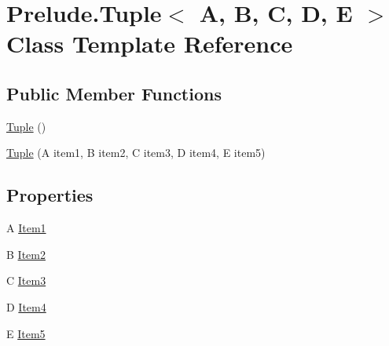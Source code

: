 \hypertarget{class_prelude_1_1_tuple_3_01_a_00_01_b_00_01_c_00_01_d_00_01_e_01_4}{\section{Prelude.\+Tuple$<$ A, B, C, D, E $>$ Class Template Reference}
\label{class_prelude_1_1_tuple_3_01_a_00_01_b_00_01_c_00_01_d_00_01_e_01_4}
}
\subsection*{Public Member Functions}
\begin{DoxyCompactItemize}
\item 
\hyperlink{class_prelude_1_1_tuple_3_01_a_00_01_b_00_01_c_00_01_d_00_01_e_01_4_a1b144ea223698f4d8c7433d9f493a9f0}{Tuple} ()
\item 
\hyperlink{class_prelude_1_1_tuple_3_01_a_00_01_b_00_01_c_00_01_d_00_01_e_01_4_ad92b8e0ca2416f0233f61d047e29d906}{Tuple} (A item1, B item2, C item3, D item4, E item5)
\end{DoxyCompactItemize}
\subsection*{Properties}
\begin{DoxyCompactItemize}
\item 
A \hyperlink{class_prelude_1_1_tuple_3_01_a_00_01_b_00_01_c_00_01_d_00_01_e_01_4_a5397a56c1b2d4914ad4adbd95fed35a5}{Item1}
\item 
B \hyperlink{class_prelude_1_1_tuple_3_01_a_00_01_b_00_01_c_00_01_d_00_01_e_01_4_a673868ea1ddededa034ba7b745e04d90}{Item2}
\item 
C \hyperlink{class_prelude_1_1_tuple_3_01_a_00_01_b_00_01_c_00_01_d_00_01_e_01_4_acf532e5def7b6d4352eb806855bd929b}{Item3}
\item 
D \hyperlink{class_prelude_1_1_tuple_3_01_a_00_01_b_00_01_c_00_01_d_00_01_e_01_4_a9a501da5e5aff665079cff9283a58c5c}{Item4}
\item 
E \hyperlink{class_prelude_1_1_tuple_3_01_a_00_01_b_00_01_c_00_01_d_00_01_e_01_4_a3e2da27dd432de7c0e55306ba856b5e2}{Item5}
\end{DoxyCompactItemize}


